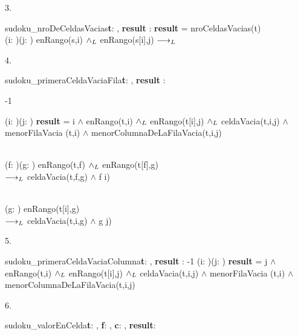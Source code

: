 \documentclass[a4paper]{article}
\begin{document}
3. \begin{proc}{sudoku\_nroDeCeldasVacias}{\textbf{\In t}: \matriz{\ent}, \textbf{\Out result} : \ent }{}{}
    \post
		{
			\textbf{result} = nroCeldasVacias(t)
			{\\
				(\forall i: \ent)(\forall j: \ent) enRango(s,i) $\land _L$ enRango(s[i],j) $\longrightarrow _L$ \\
				\sum {}
			}
		}
	\end{proc}

4. \begin{proc}{sudoku\_primeraCeldaVaciaFila}{\textbf{\In t}: \matriz{\ent}, \textbf{\Out result} : \ent  }{}{}
    \post
		{
			{-1}
			{
				(\exists i: \ent)(\exists j: \ent) \textbf{result} = i $\land$ enRango(t,i) $\land _L$ enRango(t[i],j)        $\land _L$ celdaVacia(t,i,j) $\land$ menorFilaVacia (t,i) $\land$ menorColumnaDeLaFilaVacia(t,i,j)
				
				{\\
					(\forall f: \ent)(\forall g: \ent) enRango(t,f) $\land _L$ enRango(t[f],g)\\
					$\longrightarrow _L$ celdaVacia(t,f,g) $\land$ f \geq i)
				}
		
			{\\
				(\forall g: \ent) enRango(t[i],g)\\
				$\longrightarrow _L$ celdaVacia(t,i,g) $\land$ g \geq j)
			}
			}
		}
	\end{proc}

5. \begin{proc}{sudoku\_primeraCeldaVaciaColumna}{\textbf{\In t}: \matriz{\ent}, \textbf{\Out result} : \ent }{}{}
    \post
		{
			{-1}
			{
				(\exists i: \ent)(\exists j: \ent) \textbf{result} = j $\land$ enRango(t,i) $\land _L$ enRango(t[i],j)        $\land _L$ celdaVacia(t,i,j) $\land$ menorFilaVacia (t,i) $\land$ menorColumnaDeLaFilaVacia(t,i,j)
			}
		}
	\end{proc}

6. \begin{proc}{sudoku\_valorEnCelda}{\textbf{\In t}: \matriz{\ent}, \textbf{\In f}: \ent, \textbf{\In c}: \ent, \textbf{\Out result}: \bool}{}{}
	\end{proc}
\end{document}
